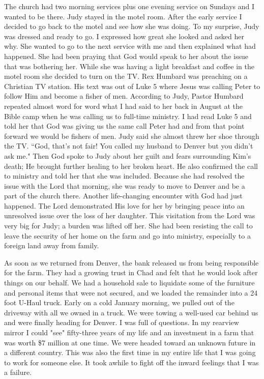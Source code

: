 \documentclass[oneside,12pt]{book}
\begin{document}
The church had two morning services plus one evening service on Sundays and I wanted to be there. Judy stayed in the motel room. After the early service I decided to go back to the motel and see how she was doing. To my surprise, Judy was dressed and ready to go. I expressed how great she looked and asked her why. She wanted to go to the next service with me and then explained what had happened. She had been praying that God would speak to her about the issue that was bothering her. While she was having a light breakfast and coffee in the motel room she decided to turn on the TV. Rex Humbard was preaching on a Christian TV station. His text was out of Luke 5 where Jesus was calling Peter to follow Him and become a fisher of men. According to Judy, Pastor Humbard repeated almost word for word what I had said to her back in August at the Bible camp when he was calling us to full-time ministry. I had read Luke 5 and told her that God was giving us the same call Peter had and from that point forward we would be fishers of men. Judy said she almost threw her shoe through the TV. ``God, that's not fair! You called my husband to Denver but you didn't ask me." Then God spoke to Judy about her guilt and fears surrounding Kim's death; He brought further healing to her broken heart. He also confirmed the call to ministry and told her that she was included. Because she had resolved the issue with the Lord that morning, she was ready to move to Denver and be a part of the church there. Another life-changing encounter with God had just happened. The Lord demonstrated His love for her by bringing peace into an unresolved issue over the loss of her daughter. This visitation from the Lord was very big for Judy; a burden was lifted off her. She had been resisting the call to leave the security of her home on the farm and go into ministry, especially to a foreign land away from family.

As soon as we returned from Denver, the bank released us from being responsible for the farm. They had a growing trust in Chad and felt that he would look after things on our behalf. We had a household sale to liquidate some of the furniture and personal items that were not secured, and we loaded the remainder into a 24 foot U-Haul truck. Early on a cold January morning, we pulled out of the driveway with all we owned in a truck. We were towing a well-used car behind us and were finally heading for Denver. I was full of questions. In my rearview mirror I could "see" fifty-three years of my life and an investment in a farm that was worth \$7 million at one time. We were headed toward an unknown future in a different country. This was also the first time in my entire life that I was going to work for someone else. It took awhile to fight off the inward feelings that I was a failure.
\end{document}
